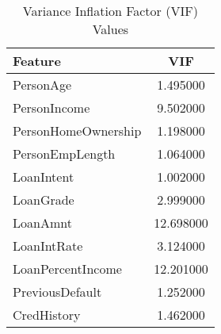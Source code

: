 \begin{table}[H]\centering
\caption{Variance Inflation Factor (VIF) Values}
\label{Table 4:vif_values}
\begin{tabular}{lc}
\toprule
Feature & VIF \\
\midrule
PersonAge & 1.495000 \\
PersonIncome & 9.502000 \\
PersonHomeOwnership & 1.198000 \\
PersonEmpLength & 1.064000 \\
LoanIntent & 1.002000 \\
LoanGrade & 2.999000 \\
LoanAmnt & 12.698000 \\
LoanIntRate & 3.124000 \\
LoanPercentIncome & 12.201000 \\
PreviousDefault & 1.252000 \\
CredHistory & 1.462000 \\
\bottomrule
\end{tabular}
\end{table}
